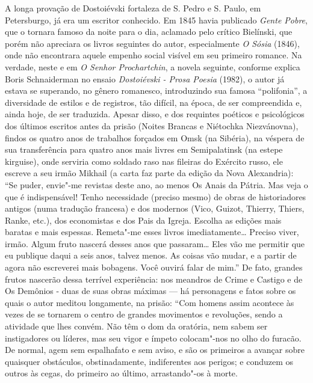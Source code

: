 A longa provação de Dostoiévski fortaleza de S. Pedro e S. Paulo, em
Petersburgo, já era um escritor conhecido. Em 1845 havia publicado
\emph{Gente Pobre}, que o tornara famoso da noite para o dia, aclamado
pelo crítico Bielínski, que porém não apreciara os livros seguintes do
autor, especialmente \emph{O Sósia} (1846), onde não encontrara aquele empenho
social visível em seu primeiro romance. Na verdade, neste e em \emph{O Senhor
Prochartchin}, a novela seguinte, conforme explica Boris Schnaiderman no
ensaio \emph{Dostoiévski - Prosa Poesia} (1982), o autor já estava se
superando, no gênero romanesco, introduzindo sua famosa ``polifonia'', a
diversidade de estilos e de registros, tão difícil, na época, de ser
compreendida e, ainda hoje, de ser traduzida. Apesar disso, e dos
requintes poéticos e psicológicos dos últimos escritos antes da prisão
(Noites Brancas e Niétochka Niezvánovna), findos os quatro anos de
trabalhos forçados em Omsk (na Sibéria), na véspera de sua transferência
para quatro anos mais livres em Semipalatinsk (na estepe kirguise), onde
serviria como soldado raso nas fileiras do Exército russo, ele escreve a
seu irmão Mikhail (a carta faz parte da edição da Nova Alexandria): ``Se
puder, envie"-me revistas deste ano, ao menos Os Anais da Pátria. Mas
veja o que é indispensável! Tenho necessidade (preciso mesmo) de obras
de historiadores antigos (numa tradução francesa) e dos modernos (Vico,
Guizot, Thierry, Thiers, Ranke, etc.), dos economistas e dos Pais da
Igreja. Escolha as edições mais baratas e mais espessas. Remeta"-me esses
livros imediatamente\ldots{} Preciso viver, irmão. Algum fruto nascerá desses
anos que passaram\ldots{} Eles vão me permitir que eu publique daqui a seis
anos, talvez menos. As coisas vão mudar, e a partir de agora não
escreverei mais bobagens. Você ouvirá falar de mim.'' De fato, grandes
frutos nascerão dessa terrível experiência: nos meandros de Crime e
Castigo e de Os Demônios - duas de suas obras máximas --- há personagens
e fatos sobre os quais o autor meditou longamente, na prisão: ``Com
homens assim acontece às vezes de se tornarem o centro de grandes
movimentos e revoluções, sendo a atividade que lhes convém. Não têm o
dom da oratória, nem sabem ser instigadores ou líderes, mas seu vigor e
ímpeto colocam"-nos no olho do furacão. De normal, agem sem espalhafato e
sem aviso, e são os primeiros a avançar sobre quaisquer obstáculos,
obstinadamente, indiferentes aos perigos; e conduzem os outros às cegas,
do primeiro ao último, arrastando"-os à morte.

